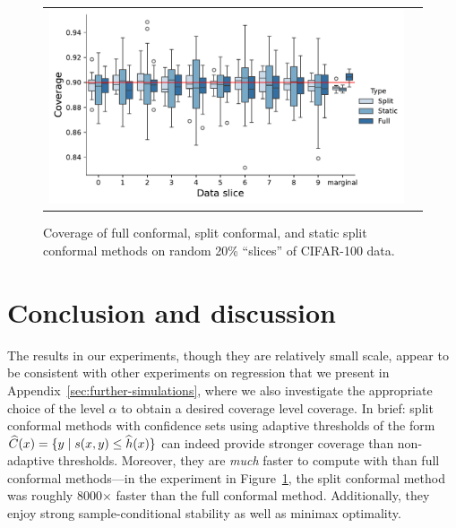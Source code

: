 \documentclass{article}
\newcommand{\scorefunc}{s}
\newcommand{\scoreval}{\scorefunc}
\begin{document}
\begin{figure}
  \begin{center}
    \begin{tabular}{cc}
      \begin{minipage}{.78\columnwidth}
        \includegraphics[width=\columnwidth]{Images/random_directions_experiment}
      \end{minipage} &
      \hspace{-1cm}
      \begin{minipage}{.28\columnwidth}
        \caption{\label{fig:random-directions} Coverage of full conformal, split
          conformal, and static split conformal methods on random 20\%
          ``slices'' of CIFAR-100 data.}
      \end{minipage}
    \end{tabular}
  \end{center}
\end{figure}

\section{Conclusion and discussion}

The results in our experiments, though they are relatively small scale,
appear to be consistent with other experiments on regression
that we present in Appendix~\ref{sec:further-simulations}, where
we also investigate the appropriate choice of the level $\alpha$
to obtain a desired coverage level coverage.
%
In brief: split conformal methods with confidence sets using adaptive
thresholds of the form $\what{C}(x) = \{y \mid \scoreval(x, y) \le
\what{h}(x)\}$ can indeed provide stronger coverage than non-adaptive
thresholds.
%
Moreover, they are \emph{much} faster to compute with than full conformal
methods---in the experiment in Figure~\ref{fig:random-directions},
the split conformal method was roughly 8000$\times$ faster than
the full conformal method.
%
Additionally, they enjoy strong sample-conditional stability
as well as minimax optimality.
\end{document}
